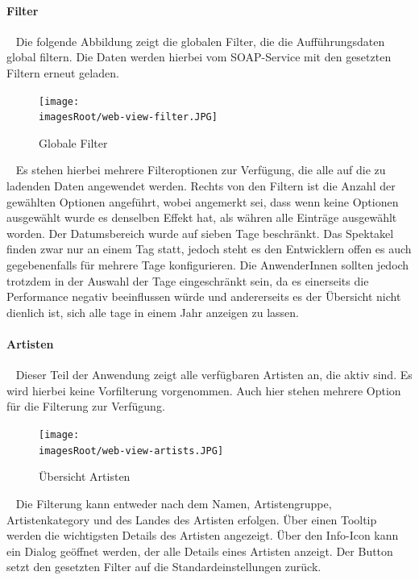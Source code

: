 \documentclass[11pt, a4paper, twoside]{article}   	%
\newcommand{\imagesRoot}{images}
\begin{document}
\paragraph{Filter}
\ \newline
Die folgende Abbildung zeigt die globalen Filter, die die Aufführungsdaten global filtern. Die Daten werden hierbei vom SOAP-Service mit den gesetzten Filtern erneut geladen.
\begin{figure}[h]
	\centering
	\texttt{[image: \\imagesRoot/web-view-filter.JPG]}
	\caption
	{Globale Filter}
\end{figure}
\ \newline
Es stehen hierbei mehrere Filteroptionen zur Verfügung, die alle auf die zu ladenden Daten angewendet werden. Rechts von den Filtern ist die Anzahl der gewählten Optionen angeführt, wobei angemerkt sei, dass wenn keine Optionen ausgewählt wurde es denselben Effekt hat, als währen alle Einträge ausgewählt worden. Der Datumsbereich wurde auf sieben Tage beschränkt. Das Spektakel finden zwar nur an einem Tag statt, jedoch steht es den Entwicklern offen es auch gegebenenfalls für mehrere Tage konfigurieren. Die AnwenderInnen sollten jedoch trotzdem in der Auswahl der Tage eingeschränkt sein, da es einerseits die Performance negativ beeinflussen würde und andererseits es der Übersicht nicht dienlich ist, sich alle tage in einem Jahr anzeigen zu lassen.
\newpage

\paragraph{Artisten}
\ \newline
Dieser Teil der Anwendung zeigt alle verfügbaren Artisten an, die aktiv sind. Es wird hierbei keine Vorfilterung vorgenommen. Auch hier stehen mehrere Option für die Filterung zur Verfügung.
\begin{figure}[h]
	\centering
	\texttt{[image: \\imagesRoot/web-view-artists.JPG]}
	\caption
	{Übersicht Artisten}
\end{figure}
\ \newline
Die Filterung kann entweder nach dem Namen, Artistengruppe, Artistenkategory und des Landes des Artisten erfolgen. Über einen Tooltip werden die wichtigsten Details des Artisten angezeigt. Über den Info-Icon kann ein Dialog geöffnet werden, der alle Details eines Artisten anzeigt. Der Button setzt den gesetzten Filter auf die Standardeinstellungen zurück.
\end{document}
